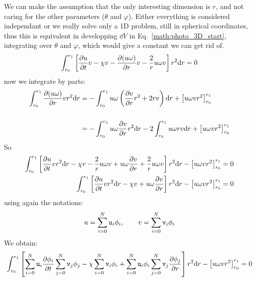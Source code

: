 We can make the assumption that the only interesting dimension is $r$, and
not caring for the other parameters ($\theta$ and $\varphi$). Either everything
is considered independant or we really solve only a 1D problem, still in spherical
coordinates, thus this is equivalent in developping $\dd V$ in Eq.~\ref{math:photo_3D_start}, integrating
over $\theta$ and $\varphi$, which would give a constant we can get rid of.
\begin{equation}
\int_{r_0}^{r_1}\left[   \frac{\partial u}{\partial t} v 
                       - \chi v - \frac{\partial(u\omega)}{\partial r} v
                       - \frac{2}{r}u\omega v
                \right] r^2 \mathrm{d} r = 0
\end{equation}
now we integrate by parts:
\begin{equation}
\begin{split}
\int_{r_0}^{r_1}\frac{\partial(u\omega)}{\partial r} v r^2 \mathrm{d} r 
   & = - \int_{r_0}^{r_1}u\omega \left(\frac{\partial v}{\partial r}r^2 + 2 r v\right) \mathrm{d} r + \left[u\omega v r^2\right]_{r_0}^{r_1}
        \\[\baselineskip]
   & = - \int_{r_0}^{r_1}u\omega \frac{\partial v}{\partial r} r^2  \mathrm{d} r - 2 \int_{r_0}^{r_1}u\omega  r v \mathrm{d} r  + \left[u\omega v r^2\right]_{r_0}^{r_1}
\end{split}
\end{equation}
So
\begin{equation}
\begin{split}
\int_{r_0}^{r_1} \left[   \frac{\partial u}{\partial t} v r^2 \mathrm{d} r
                        - \chi v
                        - \frac{2}{r} u\omega v
                        + u\omega\frac{\partial v}{\partial r}
                        + \frac{2}{r} u\omega v
                 \right] r^2 \mathrm{d} r 
     - \left[u\omega v r^2\right]_{r_0}^{r_1}   & = 0 \\
\int_{r_0}^{r_1} \left[   \frac{\partial u}{\partial t} v r^2 \mathrm{d} r
                        - \chi v
                        + u\omega\frac{\partial v}{\partial r}
                 \right] r^2 \mathrm{d} r 
     - \left[u\omega v r^2\right]_{r_0}^{r_1}   & = 0 
\end{split}
\end{equation}
using again the notations:
\begin{equation}
u = \sum_{i=0}^{N} \mathtt{u}_i \phi_i, \qquad v = \sum_{i=0}^{N} \mathtt{v}_i \phi_i
\end{equation}
We obtain:
\begin{equation}
 \int_{r_0}^{r_1}\left[
                  \sum_{i=0}^{N}\mathtt{u}_i\frac{\partial\phi_i}{\partial t} \sum_{j=0}^{N}\mathtt{v}_j \phi_j
                 - \chi \sum_{i=0}^{N}\mathtt{v}_i\phi_i 
                 + \sum_{i=0}^{N}\mathtt{u}_i\phi_i\sum_{j=0}^{N}\mathtt{v}_j\frac{\partial\phi_j}{\partial r}\right]r^2\mathrm{d} r
 - \left[u\omega v r^2\right]_{r_0}^{r_1} = 0
\end{equation}
